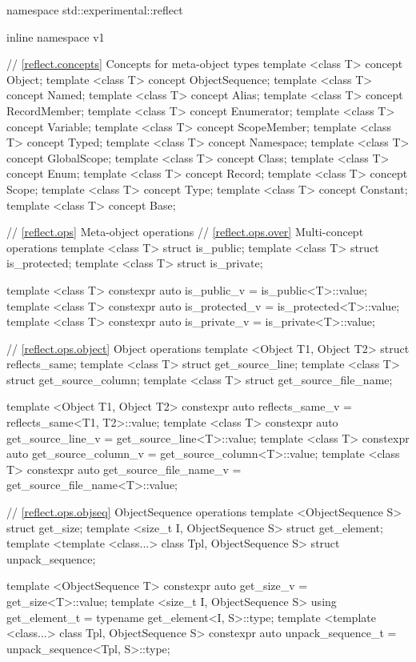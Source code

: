 \begin{std.txt}\color{addclr}
\begin{codeblock}
namespace std::experimental::reflect {
inline namespace v1 {

// \ref{reflect.concepts} Concepts for meta-object types
template <class T> concept Object;
template <class T> concept ObjectSequence;
template <class T> concept Named;
template <class T> concept Alias;
template <class T> concept RecordMember;
template <class T> concept Enumerator;
template <class T> concept Variable;
template <class T> concept ScopeMember;
template <class T> concept Typed;
template <class T> concept Namespace;
template <class T> concept GlobalScope;
template <class T> concept Class;
template <class T> concept Enum;
template <class T> concept Record;
template <class T> concept Scope;
template <class T> concept Type;
template <class T> concept Constant;
template <class T> concept Base;


// \ref{reflect.ops} Meta-object operations
// \ref{reflect.ops.over} Multi-concept operations
template <class T> struct is_public;
template <class T> struct is_protected;
template <class T> struct is_private;

template <class T>
  constexpr auto is_public_v = is_public<T>::value;
template <class T>
  constexpr auto is_protected_v = is_protected<T>::value;
template <class T>
  constexpr auto is_private_v = is_private<T>::value;

// \ref{reflect.ops.object} Object operations
template <Object T1, Object T2> struct reflects_same;
template <class T> struct get_source_line;
template <class T> struct get_source_column;
template <class T> struct get_source_file_name;

template <Object T1, Object T2>
  constexpr auto reflects_same_v = reflects_same<T1, T2>::value;
template <class T>
  constexpr auto get_source_line_v = get_source_line<T>::value;
template <class T>
  constexpr auto get_source_column_v = get_source_column<T>::value;
template <class T>
  constexpr auto get_source_file_name_v = get_source_file_name<T>::value;

// \ref{reflect.ops.objseq} ObjectSequence operations
template <ObjectSequence S> struct get_size;
template <size_t I, ObjectSequence S> struct get_element;
template <template <class...> class Tpl, ObjectSequence S>
  struct unpack_sequence;

template <ObjectSequence T>
  constexpr auto get_size_v = get_size<T>::value;
template <size_t I, ObjectSequence S>
  using get_element_t = typename get_element<I, S>::type;
template <template <class...> class Tpl, ObjectSequence S>
  constexpr auto unpack_sequence_t = unpack_sequence<Tpl, S>::type;

}}
\end{codeblock}
\end{std.txt}
